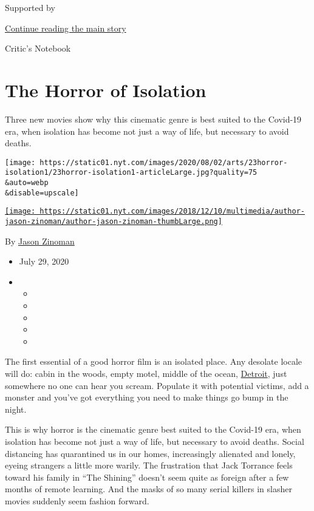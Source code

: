 Supported by

\protect\hyperlink{after-sponsor}{Continue reading the main story}

Critic's Notebook

\hypertarget{the-horror-of-isolation}{%
\section{The Horror of Isolation}\label{the-horror-of-isolation}}

Three new movies show why this cinematic genre is best suited to the
Covid-19 era, when isolation has become not just a way of life, but
necessary to avoid deaths.

\texttt{[image: https://static01.nyt.com/images/2020/08/02/arts/23horror-isolation1/23horror-isolation1-articleLarge.jpg?quality=75\\\&auto=webp\\\&disable=upscale]}

\href{https://www.nytimes.com/by/jason-zinoman}{\texttt{[image: https://static01.nyt.com/images/2018/12/10/multimedia/author-jason-zinoman/author-jason-zinoman-thumbLarge.png]}}

By \href{https://www.nytimes.com/by/jason-zinoman}{Jason Zinoman}

\begin{itemize}
\item
  July 29, 2020
\item
  \begin{itemize}
  \item
  \item
  \item
  \item
  \item
  \end{itemize}
\end{itemize}

The first essential of a good horror film is an isolated place. Any
desolate locale will do: cabin in the woods, empty motel, middle of the
ocean,
\href{https://www.freep.com/story/entertainment/movies/julie-hinds/2016/08/25/dont-breathe-horror-film-detroit/89304296/}{Detroit},
just somewhere no one can hear you scream. Populate it with potential
victims, add a monster and you've got everything you need to make things
go bump in the night.

This is why horror is the cinematic genre best suited to the Covid-19
era, when isolation has become not just a way of life, but necessary to
avoid deaths. Social distancing has quarantined us in our homes,
increasingly alienated and lonely, eyeing strangers a little more
warily. The frustration that Jack Torrance feels toward his family in
``The Shining'' doesn't seem quite as foreign after a few months of
remote learning. And the masks of so many serial killers in slasher
movies suddenly seem fashion forward.

